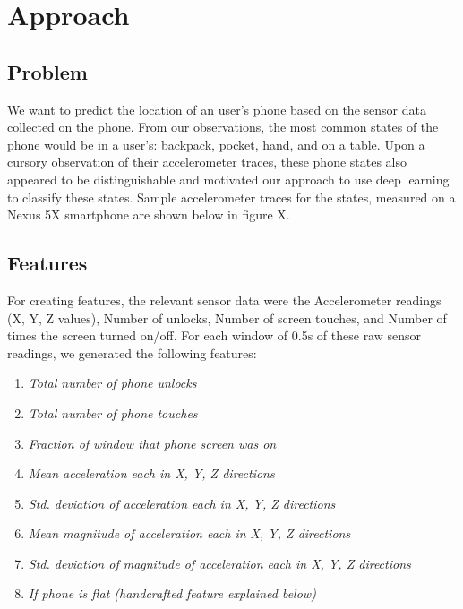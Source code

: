 \section{Approach}

\subsection{Problem}
We want to predict the location of an user's phone based on the sensor data collected on the phone. 
From our observations, the most common states of the phone would be in a user's: backpack, pocket, hand, and on a table.
Upon a cursory observation of their accelerometer traces, these phone states also appeared to be distinguishable and motivated
our approach to use deep learning to classify these states. Sample accelerometer traces for the states, measured on a Nexus 5X
smartphone are shown below in figure X.

\begin{center}
 \scalebox{0.375}{}
  \scalebox{0.375}{}
  \scalebox{0.375}{}
  \scalebox{0.375}{}
\end{center}



\subsection{Features}
For creating features, the relevant sensor data were the Accelerometer readings (X, Y, Z values), Number of unlocks, Number of screen touches, and Number of times the screen turned on/off. For each window of 0.5s of these raw sensor readings, we generated the following features:

\begin{enumerate}
\item \textit{Total number of phone unlocks}
\item \textit{Total number of phone touches}
\item \textit{Fraction of window that phone screen was on}
\item \textit{Mean acceleration each in X, Y, Z directions}
\item \textit{Std. deviation of acceleration each in X, Y, Z directions}
\item \textit{Mean magnitude of acceleration each in X, Y, Z directions}
\item \textit{Std. deviation of magnitude of acceleration each in X, Y, Z directions}
\item \textit{If phone is flat (handcrafted feature explained below)}
\end{enumerate}

